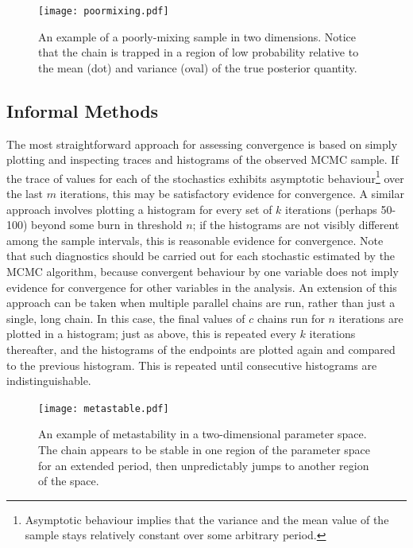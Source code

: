 \begin{figure}[ht]
\begin{center}
\texttt{[image: poormixing.pdf]}
\caption{An example of a poorly-mixing sample in two dimensions. Notice that the chain is trapped in a region of low probability relative to the mean (dot) and variance (oval) of the true posterior quantity.}
\label{fig:mix}
\end{center}
\end{figure}

\subsection{Informal Methods}

The most straightforward approach for assessing convergence is based on
simply plotting and inspecting traces and histograms of the observed MCMC
sample. If the trace of values for each of the stochastics exhibits asymptotic
behaviour\footnote{Asymptotic behaviour implies that the variance and the
mean value of the sample stays relatively constant over some arbitrary
period.} over the last $m$ iterations, this may be satisfactory evidence
for convergence. A similar approach involves plotting a histogram for every
set of $k$ iterations (perhaps 50-100) beyond some burn in threshold $n$;
if the histograms are not visibly different among the sample intervals,
this is reasonable evidence for convergence. Note that such diagnostics
should be carried out for each stochastic estimated by the MCMC algorithm,
because convergent behaviour by one variable does not imply evidence for
convergence for other variables in the analysis. An extension of this approach
can be taken when multiple parallel chains are run, rather than just a
single, long chain. In this case, the final values of $c$ chains run for
$n$ iterations are plotted in a histogram; just as above, this is repeated
every $k$ iterations thereafter, and the histograms of the endpoints are
plotted again and compared to the previous histogram. This is repeated
until consecutive histograms are indistinguishable.

\begin{figure}[h]
\begin{center}
\texttt{[image: metastable.pdf]}
\caption{An example of metastability in a two-dimensional parameter space. The chain appears to be stable in one region of the parameter space for an extended period, then unpredictably jumps to another region of the space.}
\label{fig:metas}
\end{center}
\end{figure}

